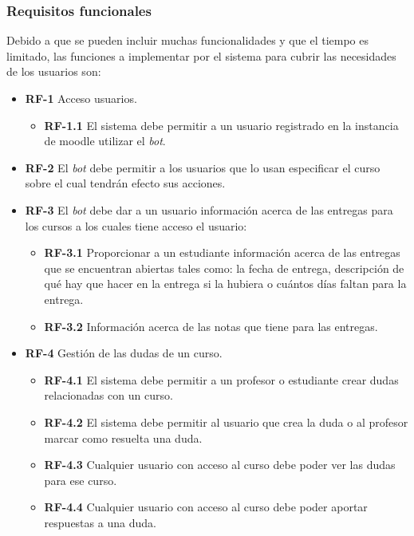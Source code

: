 \subsubsection{Requisitos funcionales}

Debido a que se pueden incluir muchas funcionalidades y que el tiempo es limitado, las funciones a implementar por el sistema para cubrir las necesidades de los usuarios son:

\renewcommand{\labelenumii}{\theenumii}
\renewcommand{\theenumii}{\theenumi.\arabic{enumii}.}


\begin{itemize}


\item \textbf{RF-1} Acceso usuarios.
	\begin{itemize}
	\item \textbf{RF-1.1} El sistema debe permitir a un usuario registrado en la instancia de moodle utilizar el \textit{bot}.
	\end{itemize}

\item \textbf{RF-2} El \textit{bot} debe permitir a los usuarios que lo usan especificar el curso sobre el cual tendrán efecto sus acciones.
	
\item \textbf{RF-3} El \textit{bot} debe dar a un usuario información acerca de las entregas para los cursos a los cuales tiene acceso el usuario:
\begin{itemize}
	\item\textbf{RF-3.1} Proporcionar a un estudiante información acerca de las entregas que se encuentran abiertas tales como: la fecha de entrega, descripción de qué hay que hacer en la entrega si la hubiera o cuántos días faltan para la entrega.
	
	\item\textbf{RF-3.2} Información acerca de las notas que tiene para las entregas.

	\end{itemize}	


\item \textbf{RF-4} Gestión de las dudas de un curso.
\begin{itemize}

	\item\textbf{RF-4.1} El sistema debe permitir a un profesor o estudiante crear dudas relacionadas con un curso.
	\item\textbf{RF-4.2} El sistema debe permitir al usuario que crea la duda o al profesor marcar como resuelta una duda.
	\item\textbf{RF-4.3} Cualquier usuario con acceso al curso debe poder ver las dudas para ese curso.
	\item\textbf{RF-4.4} Cualquier usuario con acceso al curso debe poder aportar respuestas a una duda.
	\end{itemize}


\end{itemize}
